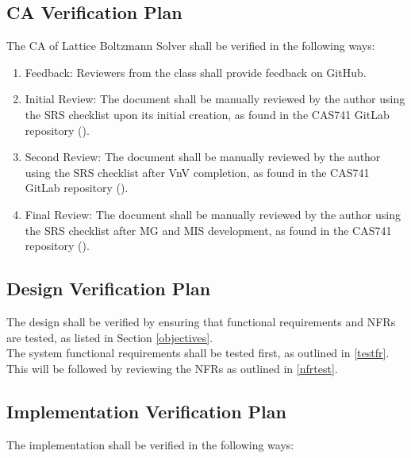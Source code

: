 \documentclass[12pt, titlepage]{article}
\newcommand{\myprogname}{Lattice Boltzmann Solver}
\begin{document}
\subsection{CA Verification Plan}

The CA of {\myprogname} shall be verified in the following ways:

\begin{enumerate}
\item Feedback: Reviewers from the class shall provide feedback on GitHub.
\item Initial Review: The document shall be manually reviewed by the author using the SRS checklist upon its initial creation, as found in the CAS741 GitLab repository (\citet{CAS741_SRS_checklist}).
\item Second Review: The document shall be manually reviewed by the author using the SRS checklist after VnV completion, as found in the CAS741 GitLab repository (\citet{CAS741_SRS_checklist}).
\item Final Review: The document shall be manually reviewed by the author using the SRS checklist after MG and MIS development, as found in the CAS741 repository (\citet{CAS741_SRS_checklist}).
\end{enumerate}

\subsection{Design Verification Plan}

The design shall be verified by ensuring that functional requirements and NFRs are tested, as listed in Section \ref{objectives}.\\

\noindent The system functional requirements shall be tested first, as outlined in \ref{testfr}. This will be followed by reviewing the NFRs as outlined in \ref{nfrtest}.


\subsection{Implementation Verification Plan}
  
\noindent The implementation shall be verified in the following ways:
\end{document}
